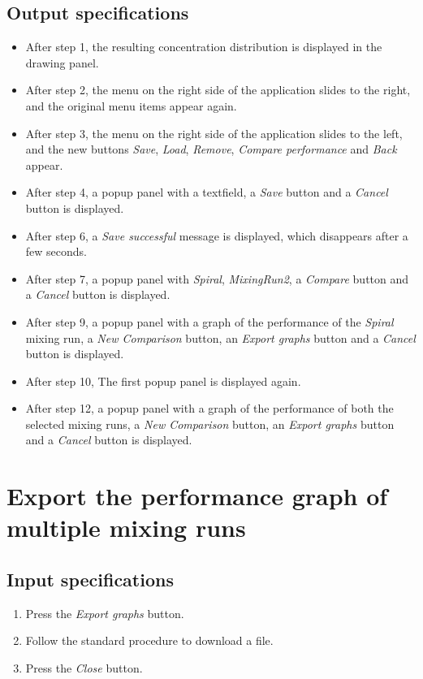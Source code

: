 \subsection*{Output specifications}
\begin{itemize}
\item After step 1, the resulting concentration distribution is displayed in the drawing panel.
\item After step 2, the menu on the right side of the application slides to the right, and the original menu items appear again.
\item After step 3, the menu on the right side of the application slides to the left, and the new buttons \emph{Save}, \emph{Load}, \emph{Remove}, \emph{Compare performance} and \emph{Back} appear.
\item After step 4, a popup panel with a textfield, a \emph{Save} button and a \emph{Cancel} button is displayed.

\item After step 6, a \emph{Save successful} message is displayed, which disappears after a few seconds.
\item After step 7, a popup panel with \emph{Spiral}, \emph{MixingRun2}, a \emph{Compare} button and a \emph{Cancel} button is displayed.
\item After step 9, a popup panel with a graph of the performance of the \emph{Spiral} mixing run, a \emph{New Comparison} button, an \emph{Export graphs} button and a \emph{Cancel} button is displayed.
\item After step 10, The first popup panel is displayed again.

\item After step 12, a popup panel with a graph of the performance of both the selected mixing runs, a \emph{New Comparison} button, an \emph{Export graphs} button and a \emph{Cancel} button is displayed.
\end{itemize}

\section{Export the performance graph of multiple mixing runs}

\subsection*{Input specifications}
\begin{enumerate}
\item Press the \emph{Export graphs} button.
\item Follow the standard procedure to download a file.
\item Press the \emph{Close} button.
\end{enumerate}

